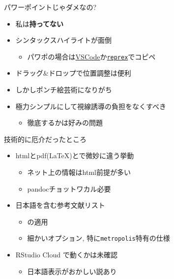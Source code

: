 \documentclass[
  12pt,
  ignorenonframetext,
]{beamer}
\providecommand{\tightlist}{%
  \setlength{\itemsep}{0pt}\setlength{\parskip}{0pt}}
\begin{document}
\begin{frame}[fragile]{パワーポイントじゃダメなの?}
\protect\hypertarget{ux30d1ux30efux30fcux30ddux30a4ux30f3ux30c8ux3058ux3083ux30c0ux30e1ux306aux306e}{}

\begin{itemize}
\tightlist
\item
  私は\textbf{持ってない}
\item
  シンタックスハイライトが面倒

  \begin{itemize}
  \tightlist
  \item
    パワポの場合は\href{https://notchained.hatenablog.com/entry/2017/02/20/221446}{VSCode}か\href{https://reprex.tidyverse.org/articles/articles/rtf.html}{\texttt{reprex}}でコピペ
  \end{itemize}
\item
  ドラッグ\&ドロップで位置調整は便利
\item
  しかしポンチ絵芸術になりがち
\item
  極力シンプルにして視線誘導の負担をなくすべき

  \begin{itemize}
  \tightlist
  \item
    徹底するかは好みの問題
  \end{itemize}
\end{itemize}

\end{frame}

\begin{frame}[fragile]{技術的に厄介だったところ}
\protect\hypertarget{ux6280ux8853ux7684ux306bux5384ux4ecbux3060ux3063ux305fux3068ux3053ux308d}{}

\begin{itemize}
\tightlist
\item
  htmlとpdf(\LaTeX)とで微妙に違う挙動

  \begin{itemize}
  \tightlist
  \item
    ネット上の情報はhtml前提が多い
  \item
    pandocチョットワカル必要
  \end{itemize}
\item
  日本語を含む参考文献リスト

  \begin{itemize}
  \tightlist
  \item
    \upBibTeX の適用
  \item
    細かいオプション, 特に\texttt{metropolis}特有の仕様
  \end{itemize}
\item
  RStudio Cloud で動くかは未確認

  \begin{itemize}
  \tightlist
  \item
    日本語表示がおかしい説あり
  \end{itemize}
\end{itemize}

\end{frame}
\end{document}
